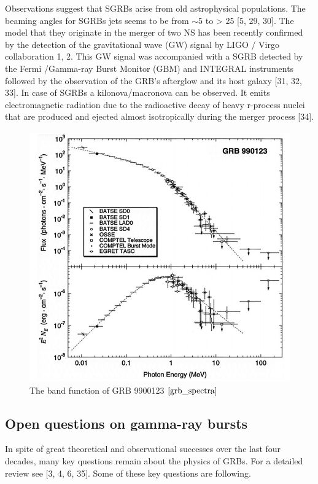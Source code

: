 \documentclass[12pt, a4paper,titlepage]{article}
\numberwithin{equation}{section}
\numberwithin{figure}{section}
\begin{document}
Observations suggest that SGRBs arise from old astrophysical populations. The beaming angles for SGRBs jets seems to be from $\sim$5 to > 25 [5, 29, 30]. The model that they originate in the merger of two NS has been recently confirmed by the detection of the gravitational wave (GW) signal by LIGO / Virgo collaboration 1, 2. This GW signal was accompanied with a SGRB detected by the Fermi /Gamma-ray Burst Monitor (GBM) and INTEGRAL instruments followed by the observation of the GRB’s afterglow and its host galaxy [31, 32, 33]. In case of SGRBs a kilonova/macronova can be observed. It emits electromagnetic radiation due to the radioactive decay of heavy r-process nuclei that are produced and ejected almost isotropically during the merger process [34].

\begin{figure}[H]
\centering
\includegraphics[width=130.0mm]{images/grb_spectra.png}
\caption{The band function of GRB 9900123 $\cite{grb_spectra}$}
\end{figure}

\subsection{Open questions on gamma-ray bursts}

In spite of great theoretical and observational successes over the last four decades, many key questions remain about the physics of GRBs. For a detailed review see [3, 4, 6, 35]. Some of these key questions are following.
\end{document}
